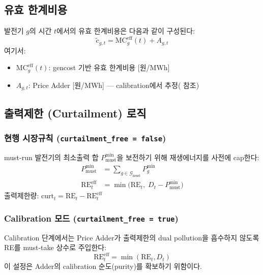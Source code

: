 \documentclass[11pt, a4paper]{article}
\begin{document}
\subsection{유효 한계비용}

발전기 $g$의 시간 $t$에서의 유효 한계비용은 다음과 같이 구성된다:
\begin{equation}\label{eq:effective_mc}
    \tilde{c}_{g,t} = \text{MC}_g^{\text{eff}}(t) + A_{g,t}
\end{equation}
여기서:
\begin{itemize}[noitemsep]
    \item $\text{MC}_g^{\text{eff}}(t)$: gencost 기반 유효 한계비용 [원/MWh]
    \item $A_{g,t}$: Price Adder [원/MWh] --- calibration에서 추정( 참조)
\end{itemize}

\subsection{출력제한 (Curtailment) 로직}

\subsubsection{현행 시장규칙 (\texttt{curtailment\_free = false})}

must-run 발전기의 최소출력 합 $P_{\text{must}}^{\min}$을 보전하기 위해
재생에너지를 사전에 cap한다:
\begin{align}
    P_{\text{must}}^{\min} &= \sum_{g \in \mathcal{G}_{\text{must}}} P_g^{\min} \\
    \text{RE}_t^{\text{eff}} &= \min\!\big(\text{RE}_t, \; D_t - P_{\text{must}}^{\min}\big) \label{eq:re_cap}
\end{align}
출력제한량: $\text{curt}_t = \text{RE}_t - \text{RE}_t^{\text{eff}}$

\subsubsection{Calibration 모드 (\texttt{curtailment\_free = true})}

Calibration 단계에서는 Price Adder가 출력제한의 dual pollution을
흡수하지 않도록 RE를 must-take 상수로 주입한다:
\begin{equation}
    \text{RE}_t^{\text{eff}} = \min(\text{RE}_t, D_t)
\end{equation}
이 설정은 Adder의 calibration 순도(purity)를 확보하기 위함이다.
\end{document}

